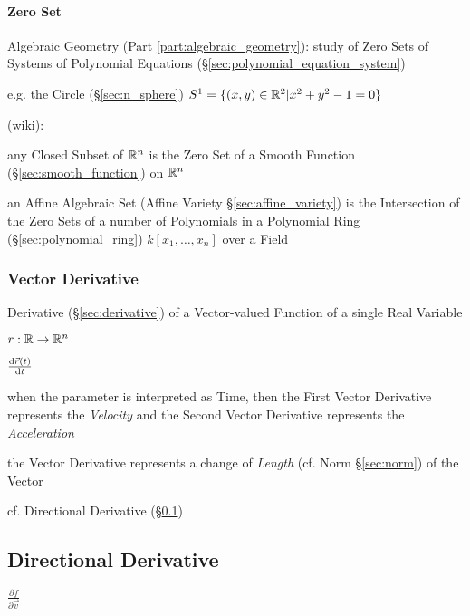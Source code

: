 \paragraph{Zero Set}\label{sec:zero_set}\hfill

\fist Algebraic Geometry (Part \ref{part:algebraic_geometry}): study of Zero
Sets of Systems of Polynomial Equations
(\S\ref{sec:polynomial_equation_system})

e.g. the Circle (\S\ref{sec:n_sphere}) $S^1 = \{ (x,y) \in \mathbb{R}^2 | x^2 + y^2
- 1 = 0 \}$

(wiki):

any Closed Subset of $\mathbb{R}^n$ is the Zero Set of a Smooth Function
(\S\ref{sec:smooth_function}) on $\mathbb{R}^n$

an Affine Algebraic Set (Affine Variety \S\ref{sec:affine_variety}) is the
Intersection of the Zero Sets of a number of Polynomials in a Polynomial Ring
(\S\ref{sec:polynomial_ring}) $k[x_1,\ldots,x_n]$ over a Field



\subsubsection{Vector Derivative}\label{sec:vector_derivative}

Derivative (\S\ref{sec:derivative}) of a Vector-valued Function of a single Real
Variable

$r : \mathbb{R} \rightarrow \mathbb{R}^n$

$\frac{\mathrm{d}\vec{r}(t)}{\mathrm{d}t}$

when the parameter is interpreted as Time, then the First Vector Derivative
represents the \emph{Velocity} and the Second Vector Derivative represents the
\emph{Acceleration}

the Vector Derivative represents a change of \emph{Length} (cf. Norm
\S\ref{sec:norm}) of the Vector

cf. Directional Derivative (\S\ref{sec:directional_derivative})



\subsection{Directional Derivative}\label{sec:directional_derivative}

$\frac{\partial{f}}{\partial{\vec{v}}}$

